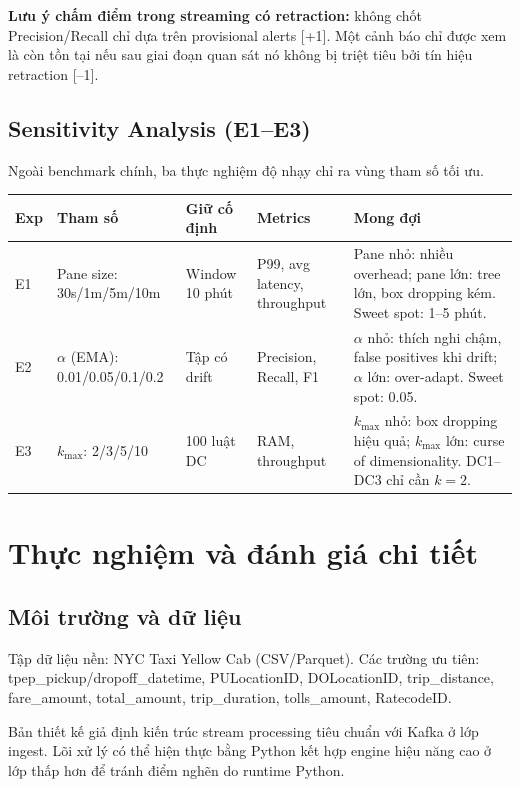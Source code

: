 \textbf{Lưu ý chấm điểm trong streaming có retraction:} không chốt Precision/Recall chỉ dựa trên provisional alerts [+1]. Một cảnh báo chỉ được xem là còn tồn tại nếu sau giai đoạn quan sát nó không bị triệt tiêu bởi tín hiệu retraction [--1].

\section{Sensitivity Analysis (E1--E3)}

Ngoài benchmark chính, ba thực nghiệm độ nhạy chỉ ra vùng tham số tối ưu.

{\small
\begin{longtable}{|L{0.10\textwidth}|L{0.22\textwidth}|L{0.18\textwidth}|L{0.18\textwidth}|L{0.22\textwidth}|}
\hline
\textbf{Exp} & \textbf{Tham số} & \textbf{Giữ cố định} & \textbf{Metrics} & \textbf{Mong đợi} \\
\hline
E1 & Pane size: 30s/1m/5m/10m & Window 10 phút & P99, avg latency, throughput & Pane nhỏ: nhiều overhead; pane lớn: tree lớn, box dropping kém. Sweet spot: 1--5 phút. \\
\hline
E2 & $\alpha$ (EMA): 0.01/0.05/0.1/0.2 & Tập có drift & Precision, Recall, F1 & $\alpha$ nhỏ: thích nghi chậm, false positives khi drift; $\alpha$ lớn: over-adapt. Sweet spot: 0.05. \\
\hline
E3 & $k_{\max}$: 2/3/5/10 & 100 luật DC & RAM, throughput & $k_{\max}$ nhỏ: box dropping hiệu quả; $k_{\max}$ lớn: curse of dimensionality. DC1--DC3 chỉ cần $k=2$. \\
\hline
\end{longtable}
}

\chapter{Thực nghiệm và đánh giá chi tiết}

\section{Môi trường và dữ liệu}

Tập dữ liệu nền: NYC Taxi Yellow Cab (CSV/Parquet). Các trường ưu tiên: tpep\_pickup/dropoff\_datetime, PULocationID, DOLocationID, trip\_distance, fare\_amount, total\_amount, trip\_duration, tolls\_amount, RatecodeID.

Bản thiết kế giả định kiến trúc stream processing tiêu chuẩn với Kafka ở lớp ingest. Lõi xử lý có thể hiện thực bằng Python kết hợp engine hiệu năng cao ở lớp thấp hơn để tránh điểm nghẽn do runtime Python.

